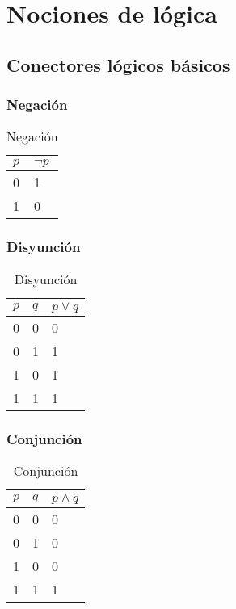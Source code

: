 \chapter{Nociones de lógica}

\section{Conectores lógicos básicos}

\subsection{Negación}

\begin{table}[htbp]
  \centering
  \begin{tabular}{|l|l|}
    \hline
    $p$ & $\neg p$ \\
    \hline
    0 & 1 \\
    1 & 0 \\
    \hline
  \end{tabular}
  \caption{Negación}
\end{table}

\subsection{Disyunción}

\begin{table}[htbp]
  \centering
  \begin{tabular}{|l|l|l|}
    \hline
    $p$ & $q$ & $p \vee q$ \\
    \hline
    0 & 0 & 0\\
    0 & 1 & 1\\
    1 & 0 & 1\\
    1 & 1 & 1\\
    \hline
  \end{tabular}
  \caption{Disyunción}
\end{table}

\subsection{Conjunción}

\begin{table}[htbp]
  \centering
  \begin{tabular}{|l|l|l|}
    \hline
    $p$ & $q$ & $p \wedge q$ \\
    \hline
    0 & 0 & 0\\
    0 & 1 & 0\\
    1 & 0 & 0\\
    1 & 1 & 1\\
    \hline
  \end{tabular}
  \caption{Conjunción}
\end{table}

